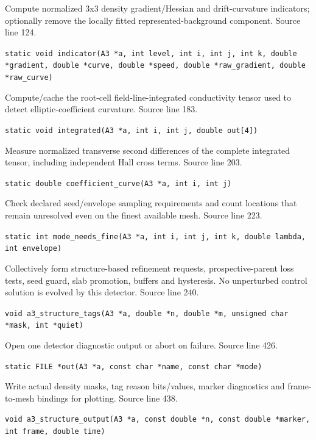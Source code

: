 \begin{description}[style=nextline,leftmargin=0pt,labelindent=0pt,labelwidth=0pt,labelsep=0pt]
\item[\texttt{indicator}] Compute normalized 3x3 density gradient/Hessian and drift-curvature indicators; optionally remove the locally fitted represented-background component. Source line 124.\par
{\small\nolinkurl{static void indicator(A3 *a, int level, int i, int j, int k, double *gradient, double *curve, double *speed, double *raw_gradient, double *raw_curve)}}
\item[\texttt{integrated}] Compute/cache the root-cell field-line-integrated conductivity tensor used to detect elliptic-coefficient curvature. Source line 183.\par
{\small\nolinkurl{static void integrated(A3 *a, int i, int j, double out[4])}}
\item[\texttt{coefficient\_curve}] Measure normalized transverse second differences of the complete integrated tensor, including independent Hall cross terms. Source line 203.\par
{\small\nolinkurl{static double coefficient_curve(A3 *a, int i, int j)}}
\item[\texttt{mode\_needs\_fine}] Check declared seed/envelope sampling requirements and count locations that remain unresolved even on the finest available mesh. Source line 223.\par
{\small\nolinkurl{static int mode_needs_fine(A3 *a, int i, int j, int k, double lambda, int envelope)}}
\item[\texttt{a3\_structure\_tags}] Collectively form structure-based refinement requests, prospective-parent loss tests, seed guard, slab promotion, buffers and hysteresis. No unperturbed control solution is evolved by this detector. Source line 240.\par
{\small\nolinkurl{void a3_structure_tags(A3 *a, double *n, double *m, unsigned char *mask, int *quiet)}}
\item[\texttt{out}] Open one detector diagnostic output or abort on failure. Source line 426.\par
{\small\nolinkurl{static FILE *out(A3 *a, const char *name, const char *mode)}}
\item[\texttt{a3\_structure\_output}] Write actual density masks, tag reason bits/values, marker diagnostics and frame-to-mesh bindings for plotting. Source line 438.\par
{\small\nolinkurl{void a3_structure_output(A3 *a, const double *n, const double *marker, int frame, double time)}}
\end{description}
